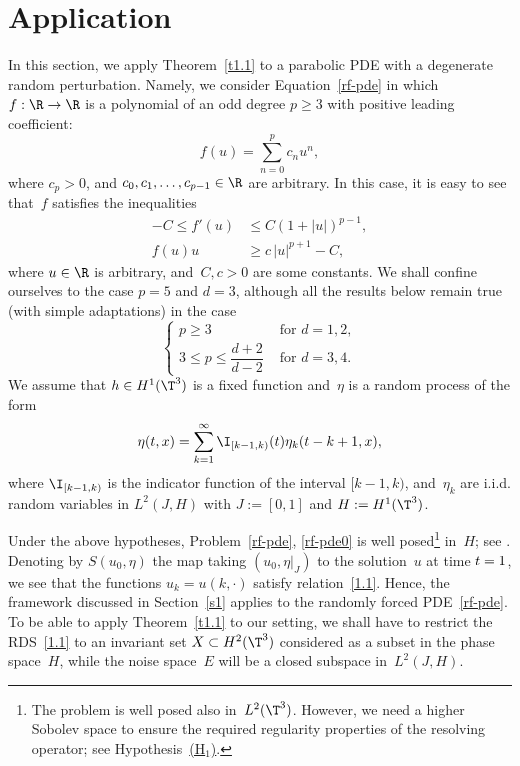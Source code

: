 \section{Application}
\label{s4}
In this section, we apply Theorem~\ref{t1.1} to a parabolic PDE with a degenerate random perturbation. Namely, we consider Equation~\eqref{rf-pde} in which $f:\R\to\R$ is a polynomial of an odd degree $p\ge3$ with positive leading coefficient:
\begin{equation} \label{nonlinear-term}
f(u)=\sum_{n=0}^p c_n u^n,
\end{equation}
where $c_p>0$, and $c_0, c_1, \ldots, c_{p-1}\in \R$ are arbitrary. In this case, it is easy to see that~$f$ satisfies the inequalities
\begin{align}
-C\le f'(u)&\le C(1+|u|)^{p-1},\label{E:4.1}\\
f(u)u&\ge c\,|u|^{p+1}-C,\label{E:4.2}
\end{align}
where $u\in\R$ is arbitrary, and~$C,c>0$ are some constants. We shall confine ourselves to the case $p=5$ and $d=3$, although all the results below remain true (with simple adaptations) in the case
\begin{equation}\label{power-dimension}
\begin{cases}p\ge3 & \text{ for } d=1,2,\\ 3\le p\le\dfrac{d+2}{d-2} & \text{ for } d=3,4. \end{cases}
\end{equation}
We assume that $h\in H^1(\T^3)$ is a fixed function and~$\eta$ is a random process of the form%
\begin{equation} \label{E:4.3}
\eta(t,x)=\sum_{k=1}^\infty \I_{[k-1,k)}(t)\eta_k(t-k+1,x),
\end{equation}
where $\I_{[k-1,k)}$ is the indicator function of the interval $[k-1,k)$, and~$\eta_k$ are i.i.d. random variables in $L^2(J,H)$ with $J:=[0,1]$ and $H:=H^1(\T^3)$.

Under the above hypotheses, Problem~\eqref{rf-pde}, \eqref{rf-pde0} is well posed\footnote{The problem is well posed also in~$L^2(\T^3)$. However, we need a higher Sobolev space to ensure the required regularity properties of the resolving operator; see Hypothesis~\hyperlink{H1}{(H$_1$)}.} in~$H$; see \cite[Chap.\,I,\,\S5]{BV1992}. Denoting by $S(u_0,\eta)$ the map taking $(u_0,\eta|_J)$ to the solution~$u$ at time $t=\nobreak1$, we see that the functions $u_k=u(k,\cdot)$ satisfy relation~\eqref{1.1}. Hence, the framework discussed in Section~\ref{s1} applies to the randomly forced PDE~\eqref{rf-pde}. To be able to apply Theorem~\ref{t1.1} to our setting, we shall have to restrict the RDS~\eqref{1.1} to an invariant set $X\subset H^2(\T^3)$ considered as a subset in the phase space~$H$, while the noise space~$E$ will be a closed subspace in~$L^2(J,H)$.

